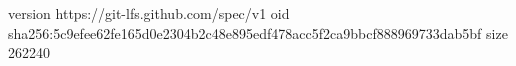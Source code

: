 version https://git-lfs.github.com/spec/v1
oid sha256:5c9efee62fe165d0e2304b2c48e895edf478acc5f2ca9bbcf888969733dab5bf
size 262240
